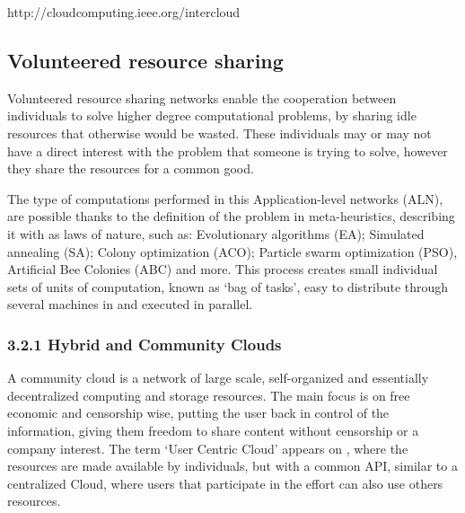 http://cloudcomputing.ieee.org/intercloud








% 
% 
\subsection{Volunteered resource sharing}

Volunteered resource sharing networks enable the cooperation between individuals to solve higher degree computational problems, by sharing idle resources that otherwise would be wasted. These individuals may or may not have a direct interest with the problem that someone is trying to solve, however they share the resources for a common good. 

The type of computations performed in this Application-level networks (ALN), are possible thanks to the definition of the problem in meta-heuristics, describing it with as laws of nature\cite{Duda2013}, such as: Evolutionary algorithms (EA); Simulated annealing (SA); Colony optimization (ACO); Particle swarm optimization (PSO), Artificial Bee Colonies (ABC) and more. This process creates small individual sets of units of computation, known as `bag of tasks', easy to distribute through several machines in and executed in parallel.
                  





\subsubsection{3.2.1 Hybrid and Community Clouds}

A community cloud is a network of large scale, self-organized and essentially decentralized computing and storage resources. The main focus is on free economic and censorship wise, putting the user back in control of the information, giving them freedom to share content without censorship or a company interest. The term `User Centric Cloud' appears on \cite{Barraca2011}, where the resources are made available by individuals, but with a common API, similar to a centralized Cloud, where users that participate in the effort can also use others resources.

